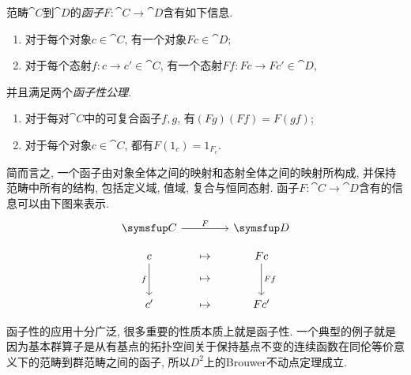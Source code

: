 范畴$\cat{C}$到$\cat{D}$的\emph{函子}$F\colon \cat{C}\to \cat{D}$含有如下信息.
\begin{enumerate}
  \item 对于每个对象$c\in\cat{C}$, 有一个对象$Fc\in \cat{D}$;
  \item 对于每个态射$f\colon c\to c'\in\cat{C}$, 有一个态射$Ff\colon Fc\to Fc'\in\cat{D}$,
\end{enumerate}
并且满足两个\emph{函子性公理}.
\begin{enumerate}
  \item 对于每对$\cat{C}$中的可复合函子$f, g$, 有$(Fg)(Ff)=F(gf)$;
  \item 对于每个对象$c\in\cat{C}$, 都有$F(1_c)=1_{F_c}$.
\end{enumerate}
简而言之, 一个函子由对象全体之间的映射和态射全体之间的映射所构成, 并保持范畴中所有的结构, 包括定义域, 值域, 复合与恒同态射. 函子$F\colon \cat{C}\to \cat{D}$含有的信息可以由下图来表示.
\begin{equation}
  \functordiagram{\cat{C}}{\cat{D}}{F}{c}{c'}{f}{Fc}{Fc'}{Ff}
\end{equation}

函子性的应用十分广泛, 很多重要的性质本质上就是函子性. 一个典型的例子就是因为基本群算子是从有基点的拓扑空间关于保持基点不变的连续函数在同伦等价意义下的范畴到群范畴之间的函子, 所以$D^2$上的Brouwer不动点定理成立\parencite[15, Theorem 1.3.3]{riehl_category_2017}.

